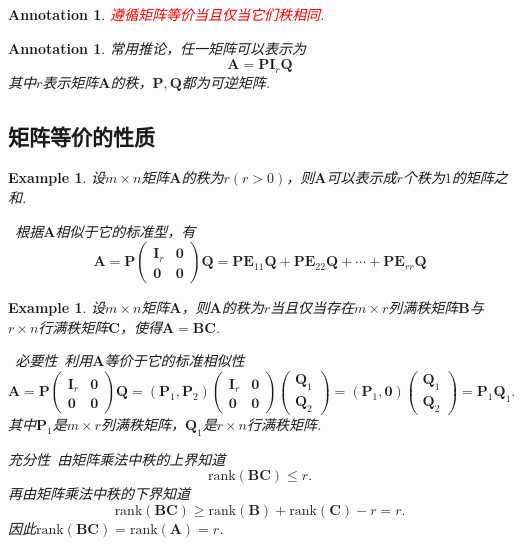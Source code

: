 \documentclass{article}
\newtheorem{example}[theorem]{Example}
\newtheorem{annotation}[theorem]{Annotation}
\newcommand{\hints}{{\color{blue} \text{hints}}}
\newcommand{\mbf}[1]{\bm{#1}}
\newcommand{\rank}[1]{\text{rank}\left(#1\right)} %
\newcommand{\redt}[1]{\textcolor{red}{#1}}
\begin{document}
\begin{annotation}
\rm \redt{遵循矩阵等价当且仅当它们秩相同}.
\end{annotation}

\begin{annotation}
\rm 常用推论，任一矩阵可以表示为
$$
\mbf{A} = \mbf{P} \mbf{I}_r \mbf{Q}
$$
其中$r$表示矩阵$\mbf{A}$的秩，$\mbf{P},\mbf{Q}$都为可逆矩阵. 
\end{annotation}

\subsection{矩阵等价的性质}

\begin{example}
\rm 设$m \times n$矩阵$\mbf{A}$的秩为$r(r>0)$，则$\mbf{A}$可以表示成$r$个秩为$1$的矩阵之和. 

\hints\ 根据$\mbf{A}$相似于它的标准型，有
$$
\mbf{A} = \mbf{P}\begin{pmatrix}
\mbf{I}_r & \mbf{0} \\
\mbf{0} & \mbf{0}
\end{pmatrix}\mbf{Q} = \mbf{P}\mbf{E}_{11}\mbf{Q} + \mbf{P}\mbf{E}_{22}\mbf{Q} + \cdots + \mbf{P}\mbf{E}_{rr}\mbf{Q}
$$
\end{example}

\begin{example}
\rm 设$m \times n$矩阵$\mbf{A}$，则$\mbf{A}$的秩为$r$当且仅当存在$m \times r$列满秩矩阵$\mbf{B}$与$r \times n$行满秩矩阵$\mbf{C}$，使得$\mbf{A}=\mbf{B}\mbf{C}$. 

\hints\ \emph{必要性}\ 利用$\mbf{A}$等价于它的标准相似性
$$
\mbf{A} = \mbf{P}\begin{pmatrix}
\mbf{I}_r & \mbf{0} \\
\mbf{0} & \mbf{0}
\end{pmatrix}\mbf{Q} = (\mbf{P}_1, \mbf{P}_2)\begin{pmatrix}
\mbf{I}_r & \mbf{0} \\
\mbf{0} & \mbf{0}
\end{pmatrix}\begin{pmatrix}
\mbf{Q}_1 \\
\mbf{Q}_2 
\end{pmatrix} = (\mbf{P}_1, \mbf{0})\begin{pmatrix}
\mbf{Q}_1 \\
\mbf{Q}_2 
\end{pmatrix} = \mbf{P}_1\mbf{Q}_1.
$$
其中$\mbf{P}_1$是$m \times r$列满秩矩阵，$\mbf{Q}_1$是$r \times n$行满秩矩阵. 

\emph{充分性}\ 由矩阵乘法中秩的上界知道
$$
\rank{\mbf{BC}} \leq r.
$$ 
再由矩阵乘法中秩的下界知道
$$
\rank{\mbf{BC}} \geq \rank{\mbf{B}} + \rank{\mbf{C}} -r =r.
$$
因此$\rank{\mbf{BC}} = \rank{\mbf{A}} = r$. 
\end{example}
\end{document}
